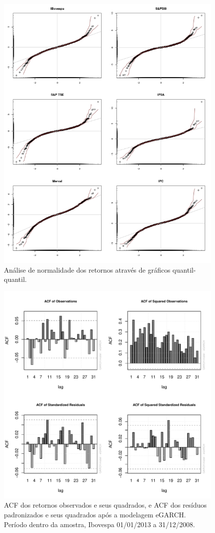 \documentclass[review]{elsarticle}
\theoremstyle{definition}
\begin{document}
\begin{figure}[H]
	\centering
	\includegraphics[width=0.9\linewidth]{figs/artigo-qqplots}
	\caption{Análise de normalidade dos retornos através de gráficos quantil-quantil.}
	\label{fig:artigo-qqplots}
\end{figure}

\begin{figure}[H]
	\centering
	\includegraphics[width=0.9\linewidth]{figs/artigo-acf-IBovespa}
	\caption{ACF dos retornos observados e seus quadrados, e ACF dos resíduos padronizados e seus quadrados após a modelagem eGARCH. Período dentro da amostra, Ibovespa 01/01/2013 a 31/12/2008.}
	\label{fig:artigo-acf-ibovespa}
\end{figure}
\end{document}
